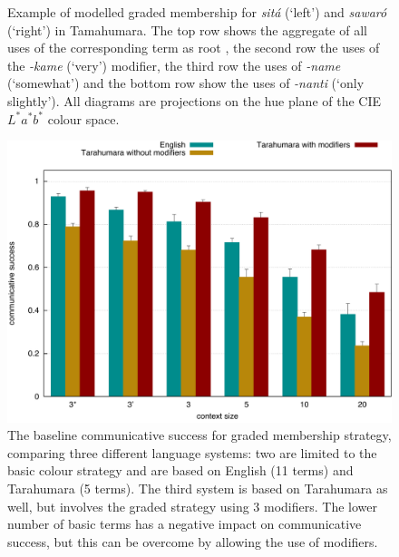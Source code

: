 \begin{figure}[htbp]
{}
\caption[Example of modelled graded membership for Tarahumara]{Example
  of modelled graded membership for \textit{sit\'a} (`left') and \textit{sawar\'o}
  (`right') in Tamahumara. The top row shows the aggregate of all uses
  of the corresponding term as root , the second row the uses of the
  \mbox{\textit{-kame}} (`very') modifier, the third row the uses of \textit{-name}
  (`somewhat') and the bottom row show the uses of \textit{-nanti} (`only
  slightly'). All diagrams are projections on the hue plane of the CIE
  $L^*a^*b^*$ colour space.}
\label{f:gms-baseline-sita-sawaro}
\end{figure}

\begin{figure}
 \centering
  \includegraphics[width=.8\textwidth]{./graded-membership/figures/baseline.pdf}
  \caption[The baseline communicative success for graded membership
  strategy]{The baseline communicative success for graded membership
    strategy, comparing three different language systems: two are
    limited to the basic colour strategy and are based on English (11
    terms) and Tarahumara (5 terms). The third system is based on
    Tarahumara as well, but involves the graded strategy using 3
    modifiers. The lower number of basic terms has a negative impact
    on communicative success, but this can be overcome by allowing the
    use of modifiers.}
  \label{f:gms-baseline}
\end{figure}

